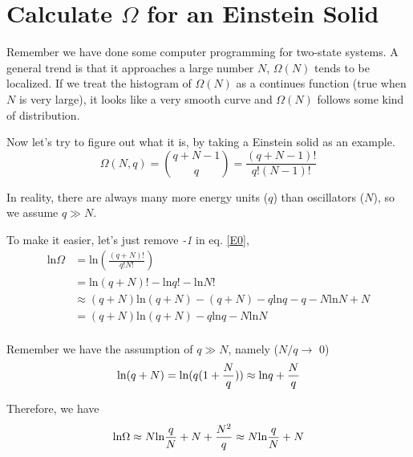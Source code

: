 

\section{Calculate $\Omega$ for an Einstein Solid}
Remember we have done some computer programming for two-state systems.
A general trend is that it approaches a large number $N$, $\Omega(N)$ tends to be localized.
If we treat the histogram of $\Omega(N)$ as a continues function (true when $N$ is very large),
it looks like a very smooth curve and $\Omega(N)$ follows some kind of distribution. 

Now let's try to figure out what it is, by taking a Einstein solid as an example. 
\begin{equation} \label{E0}
 \Omega(N, q) = \binom{q+N-1}{q} = \frac{(q+N-1)!}{q!(N-1)!}
\end{equation}

In reality, there are always many more energy units ($q$) than oscillators ($N$), so we assume $q\gg N$.

To make it easier, let's just remove \textit{-1} in eq. \ref{E0},
\begin{equation} \label{E1}
\begin{split}
 \text{ln}\Omega &= \text{ln}(\frac{(q+N)!}{q!N!})\\
         &= \text{ln}(q+N)! - \text{ln}q! - \text{ln}N!\\
   &\approx (q+N)\text{ln}(q+N) - (q+N) - q\text{ln}q - q - N\text{ln}N + N\\
        & = (q+N)\text{ln}(q+N) - q\text{ln}q - N\text{ln}N \\
\end{split}
\end{equation}

Remember we have the assumption of $q\gg N$, namely ($N/q \rightarrow$ 0)
\begin{equation} \label{E2}
       \text{ln}(q+N) = \text{ln}(q(1+\frac{N}{q}))\\
                      \approx \text{ln}q + \frac{N}{q} 
\end{equation}

Therefore, we have 
\begin{equation} \label{E3}
       \text{ln}\Omega \approx N\text{ln}\frac{q}{N} + N + \frac{N^2}{q}\\
                 \approx N\text{ln}\frac{q}{N} + N 
\end{equation}

